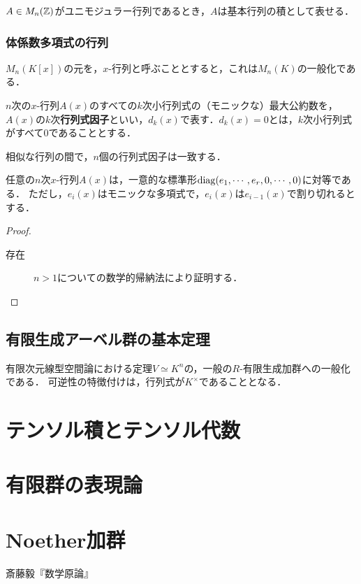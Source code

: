 \documentclass[uplatex,dvipdfmx]{jsreport}
\begin{document}
\begin{corollary}
    $A\in M_n(\mathbb{Z})$がユニモジュラー行列であるとき，$A$は基本行列の積として表せる．
\end{corollary}

\subsection{体係数多項式の行列}

\begin{tcolorbox}[colframe=ForestGreen, colback=ForestGreen!10!white,breakable,colbacktitle=ForestGreen!40!white,coltitle=black,fonttitle=\bfseries\sffamily,
title=]
    $M_n(K[x])$の元を，$x$-行列と呼ぶこととすると，これは$M_n(K)$の一般化である．
\end{tcolorbox}

\begin{definition}
    $n$次の$x$-行列$A(x)$のすべての$k$次小行列式の（モニックな）最大公約数を，$A(x)$の$k$次\textbf{行列式因子}といい，$d_k(x)$で表す．$d_k(x)=0$とは，$k$次小行列式がすべて$0$であることとする．
\end{definition}
\begin{lemma}
    相似な行列の間で，$n$個の行列式因子は一致する．
\end{lemma}

\begin{theorem}
    任意の$n$次$x$-行列$A(x)$は，一意的な標準形$\mathrm{diag}(e_1,\cdots,e_r,0,\cdots,0)$に対等である．
    ただし，$e_i(x)$はモニックな多項式で，$e_i(x)$は$e_{i-1}(x)$で割り切れるとする．
\end{theorem}
\begin{proof}\mbox{}
    \begin{description}
        \item[存在] $n>1$についての数学的帰納法により証明する．
        
    \end{description}
\end{proof}

\section{有限生成アーベル群の基本定理}

\begin{tcolorbox}[colframe=ForestGreen, colback=ForestGreen!10!white,breakable,colbacktitle=ForestGreen!40!white,coltitle=black,fonttitle=\bfseries\sffamily,
title=]
    有限次元線型空間論における定理$V\simeq K^n$の，一般の$R$-有限生成加群への一般化である．
    可逆性の特徴付けは，行列式が$K^\times$であることとなる．
\end{tcolorbox}

\chapter{テンソル積とテンソル代数}

\chapter{有限群の表現論}

\chapter{Noether加群}

\begin{thebibliography}{9}
    斎藤毅『数学原論』
\end{thebibliography}
\end{document}

